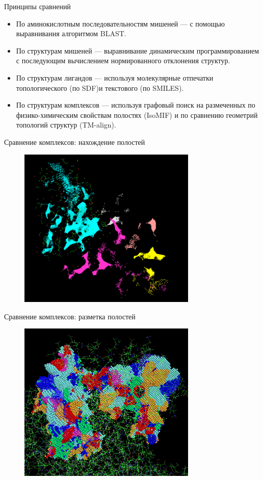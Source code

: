\documentclass[14pt]{beamer}
\begin{document}
\begin{frame}{Принципы сравнений}
	\small
	\begin{itemize}
	\item По аминокислотным последовательностям мишеней --- с помощью выравнивания алгоритмом BLAST.
	\item По структурам мишеней --- выравнивание динамическим программированием с последующим вычислением нормированного отклонения структур.
	\item По структурам лигандов --- используя молекулярные отпечатки топологического (по SDF)и текстового (по SMILES).
	\item По структурам комплексов --- используя графовый поиск на размеченных по физико-химическим свойствам полостях (IsoMIF) и по сравнению геометрий топологий структур (TM-align).
	\end{itemize}
\end{frame}

\begin{frame}{Сравнение комплексов: нахождение полостей}
	\begin{figure}
		\centering
		\includegraphics[width=85mm]{../pictures/clefts}		
	\end{figure}
\end{frame}

\begin{frame}{Сравнение комплексов: разметка полостей}
	\begin{figure}
		\centering
		\includegraphics[width=85mm]{../pictures/mif}
\end{figure}
\end{frame}
\end{document}
